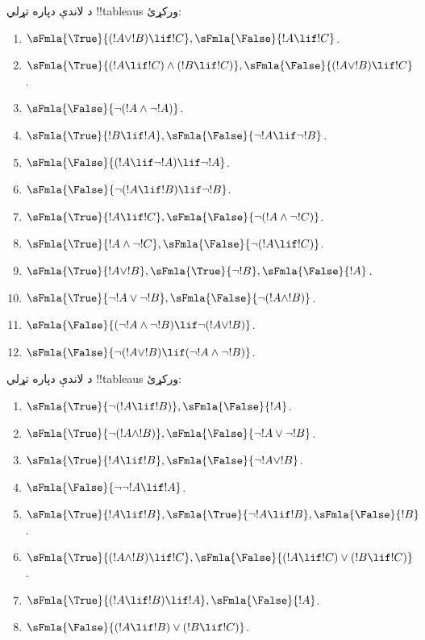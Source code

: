 \documentclass[../../../include/open-logic-section]{subfiles}
\begin{document}
\begin{prob}
د لاندې دپاره تړلي !!{tableau}s ورکړئ:
\begin{enumerate}
\item $\sFmla{\True}{(!A \lor !B) \lif !C}, \sFmla{\False}{!A \lif !C}$.
\item $\sFmla{\True}{(!A \lif !C) \land (!B \lif !C)}, \sFmla{\False}{(!A \lor !B) \lif !C}$.
\item $\sFmla{\False}{\lnot(!A \land \lnot !A)}$.
\item $\sFmla{\True}{!B \lif !A}, \sFmla{\False}{\lnot !A \lif \lnot !B}$.
\item $\sFmla{\False}{(!A \lif \lnot !A) \lif \lnot !A}$.
\item $\sFmla{\False}{\lnot(!A \lif !B) \lif \lnot !B}$.
\item $\sFmla{\True}{!A \lif !C}, \sFmla{\False}{\lnot (!A \land \lnot !C)}$.
\item $\sFmla{\True}{!A \land \lnot !C}, \sFmla{\False}{\lnot (!A \lif !C)}$.
\item $\sFmla{\True}{!A \lor !B}, \sFmla{\True}{\lnot !B}, \sFmla{\False}{!A}$.
\item $\sFmla{\True}{\lnot !A \lor \lnot !B}, \sFmla{\False}{\lnot(!A \land !B)}$.
\item $\sFmla{\False}{(\lnot !A \land \lnot !B) \lif\lnot(!A \lor !B)}$.
\item $\sFmla{\False}{\lnot(!A \lor !B) \lif (\lnot !A \land \lnot !B)}$.
\end{enumerate}
\end{prob}

\begin{prob}
د لاندې دپاره تړلي !!{tableau}s ورکړئ:
\begin{enumerate}
\item $\sFmla{\True}{\lnot(!A \lif !B)}, \sFmla{\False}{!A}$.
\item $\sFmla{\True}{\lnot(!A \land !B)}, \sFmla{\False}{\lnot !A \lor \lnot !B}$.
\item $\sFmla{\True}{!A \lif !B}, \sFmla{\False}{\lnot !A \lor !B}$.
\item $\sFmla{\False}{\lnot \lnot !A \lif !A}$.
\item $\sFmla{\True}{!A \lif !B}, \sFmla{\True}{\lnot !A \lif !B}, \sFmla{\False}{!B}$.
\item $\sFmla{\True}{(!A \land !B) \lif !C}, \sFmla{\False}{(!A \lif !C) \lor (!B \lif !C)}$.
\item $\sFmla{\True}{(!A \lif !B) \lif !A}, \sFmla{\False}{!A}$.
\item $\sFmla{\False}{(!A \lif !B) \lor (!B \lif !C)}$.
\end{enumerate}
\end{prob}
\end{document}

